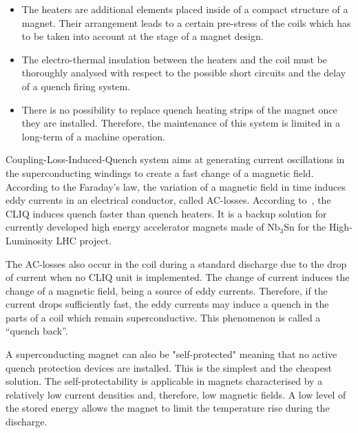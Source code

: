 \begin{itemize}
	\item The heaters are additional elements placed inside of a compact structure of a magnet. Their arrangement leads to a certain pre-stress of the coils which has to be taken into account at the stage of a magnet design.
	\item The electro-thermal insulation between the heaters and the coil must be thoroughly analysed with respect to the possible short circuits and the delay of a quench firing system.
	\item There is no possibility to replace quench heating strips of the magnet once they are installed. Therefore, the maintenance of this system is limited in a long-term of a machine operation. 
\end{itemize}

Coupling-Loss-Induced-Quench system aims at generating current oscillations in the superconducting windings to create a fast change of a magnetic field. According to the Faraday’s law, the variation of a magnetic field in time induces eddy currents in an electrical conductor, called AC-losses. According to~\cite{ravaioli_cliq_phd_thesis}, the CLIQ induces quench faster than quench heaters. It is a backup solution for currently developed high energy accelerator magnets made of $\text{Nb}_3 \text{Sn}$ for the High-Luminosity LHC project. 

The AC-losses also occur in the coil during a standard discharge due to the drop of current when no CLIQ unit is implemented. The change of current induces the change of a magnetic field, being a source of eddy currents. Therefore, if the current drops sufficiently fast, the eddy currents may induce a quench in the parts of a coil which remain superconductive. This phenomenon is called a “quench back”.

A superconducting magnet can also be "self-protected" meaning that no active quench protection devices are installed. This is the simplest and the cheapest solution. The self-protectability is applicable in magnets characterised by a relatively low current densities and, therefore, low magnetic fields. A low level of the stored energy allows the magnet to limit the temperature rise during the discharge. 

